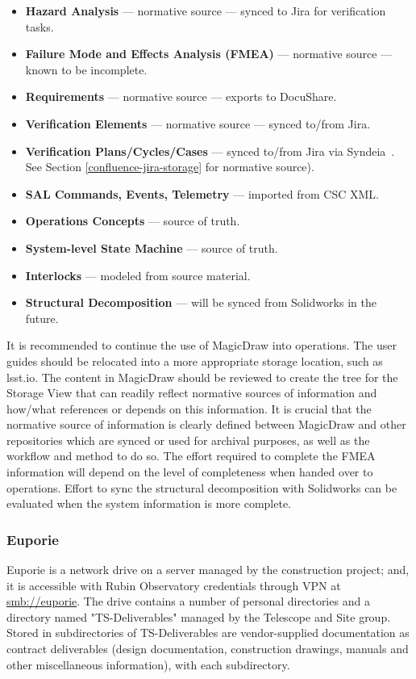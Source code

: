 \begin{itemize}
	\item \textbf{Hazard Analysis} --- normative source --- synced to Jira for verification tasks.
	\item \textbf{Failure Mode and Effects Analysis (FMEA)} --- normative source --- known to be incomplete.
	\item \textbf{Requirements} --- normative source --- exports to DocuShare.
	\item \textbf{Verification Elements} --- normative source --- synced to/from Jira.
	\item \textbf{Verification Plans/Cycles/Cases} --- synced to/from Jira via Syndeia\texttrademark\ \citep{syndeia-cite}.
	See Section \ref{confluence-jira-storage} for normative source).
	\item \textbf{SAL Commands, Events, Telemetry} --- imported from CSC XML.
	\item \textbf{Operations Concepts} --- source of truth.
	\item \textbf{System-level State Machine} --- source of truth.
	\item \textbf{Interlocks} --- modeled from source material.
	\item \textbf{Structural Decomposition} --- will be synced from Solidworks in the future.
\end{itemize}

It is recommended to continue the use of MagicDraw into operations.
The user guides should be relocated into a more appropriate storage location, such as lsst.io.
The content in MagicDraw should be reviewed to create the tree for the Storage View that can readily reflect normative sources of information and how/what references or depends on this information.
It is crucial that the normative source of information is clearly defined between MagicDraw and other repositories which are synced or used for archival purposes, as well as the workflow and method to do so.
The effort required to complete the FMEA information will depend on the level of completeness when handed over to operations.
Effort to sync the structural decomposition with Solidworks can be evaluated when the system information is more complete.

\subsubsection{Euporie}

Euporie is a network drive on a server managed by the construction project; and, it is accessible with Rubin Observatory credentials through VPN at \url{smb://euporie}.
The drive contains a number of personal directories and a directory named "TS-Deliverables" managed by the Telescope and Site group.
Stored in subdirectories of TS-Deliverables are vendor-supplied documentation as contract deliverables (design documentation, construction drawings, manuals and other miscellaneous information), with each subdirectory.

